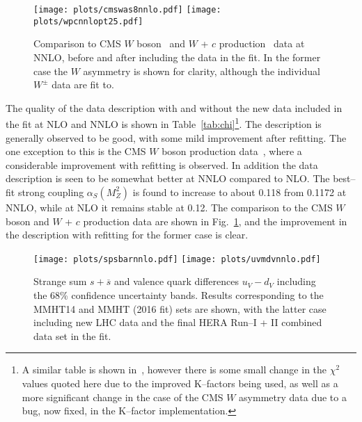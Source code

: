 \documentclass{appolb}
\begin{document}
\begin{figure}[htb]
\centerline{%
\texttt{[image: plots/cmswas8nnlo.pdf]}
\texttt{[image: plots/wpcnnlopt25.pdf]}}
\caption{Comparison to CMS $W$ boson~\cite{Khachatryan:2016pev} and $W$ + $c$ production~\cite{Chatrchyan:2013uja} data at NNLO, before and after including the data in the fit. In the former case the $W$ asymmetry is shown for clarity, although the individual $W^\pm$ data are fit to.}
\label{fig:lhcdata}
\end{figure}

The quality of the data description with and without the new data included in the fit at NLO and NNLO is shown in Table~\ref{tab:chi}\footnote{A similar table is shown in~\cite{Harland-Lang:2016zfc}, however there is some small change in the $\chi^2$ values quoted here due to the improved K--factors being used, as well as a more significant change in the case of the CMS $W$ asymmetry data due to a bug, now fixed, in the K--factor implementation.}. The description is generally observed to be good, with some mild improvement after refitting. The one exception to this is the CMS $W$ boson production data~\cite{Khachatryan:2016pev}, where a considerable improvement with refitting is observed. In addition the data description is seen to be somewhat better at NNLO compared to NLO. The best--fit strong coupling $\alpha_S(M_Z^2)$ is found to increase to about 0.118 from 0.1172 at NNLO, while at NLO it remains stable at 0.12. The comparison to the CMS $W$ boson and $W$ + $c$ production data are shown in Fig.~\ref{fig:lhcdata}, and the improvement in the description with refitting for the former case is clear.



\begin{figure}[t]
\centerline{%
\texttt{[image: plots/spsbarnnlo.pdf]}
\texttt{[image: plots/uvmdvnnlo.pdf]}}
\caption{Strange sum $s+\overline{s}$ and valence quark differences $u_V-d_V$ including the 68\% confidence uncertainty bands. Results corresponding to the MMHT14 and MMHT (2016 fit) sets are shown, with the latter case including new LHC data and the final HERA Run--I + II combined data set in the fit.}
\label{fig:lhcpdf}
\end{figure}
\end{document}
